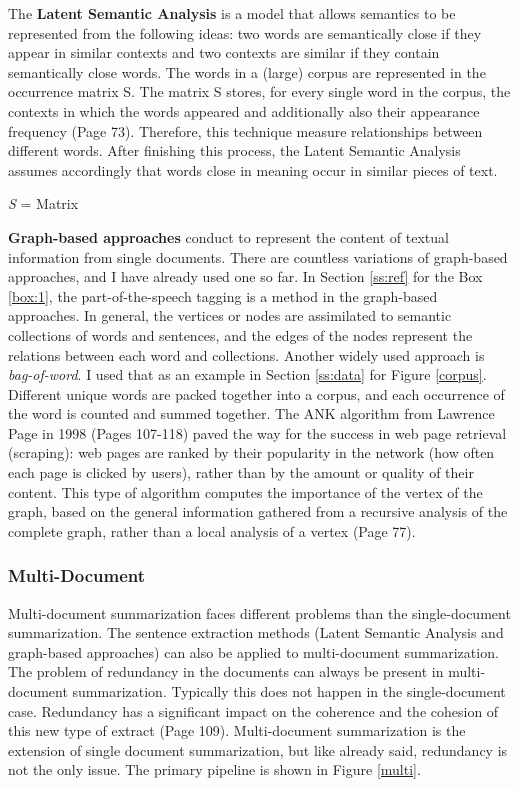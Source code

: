 The \textbf{Latent Semantic Analysis} \cite{Deerwester90indexingby} is a model that allows semantics to be represented from the following ideas: two words are semantically close if they appear in similar contexts and two contexts are similar if they contain semantically close words. The words in a (large) corpus are represented in the occurrence matrix S. The matrix S stores, for every single word in the corpus, the contexts in which the words appeared and additionally also their appearance frequency \cite{juan} (Page 73). Therefore, this technique measure relationships between different words. After finishing this process, the Latent Semantic Analysis assumes accordingly that words close in meaning occur in similar pieces of text.

\begin{tcolorbox}
	\textit{S} = Matrix
\end{tcolorbox}

\textbf{Graph-based approaches} conduct to represent the content of textual information from single documents. There are countless variations of graph-based approaches, and I have already used one so far. In Section \ref{ss:ref} for the Box \ref{box:1}, the part-of-the-speech tagging is a method in the graph-based approaches. In general, the vertices or nodes are assimilated to semantic collections of words and sentences, and the edges of the nodes represent the relations between each word and collections. 
Another widely used approach is \textit{bag-of-word}. I used that as an example in Section \ref{ss:data} for Figure \ref{corpus}. Different unique words are packed together into a corpus, and each occurrence of the word is counted and summed together. The ANK algorithm from Lawrence Page in 1998 \cite{brin1998anatomy} (Pages 107-118) paved the way for the success in web page retrieval (scraping): web pages are ranked by their popularity in the network (how often each page is clicked by users), rather than by the amount or quality of their content. This type of algorithm computes the importance of the vertex of the graph, based on the general information gathered from a recursive analysis of the complete graph, rather than a local analysis of a vertex \cite{juan} (Page 77).

\subsubsection{Multi-Document}\label{ss:multi}

Multi-document summarization faces different problems than the single-document summarization. The sentence extraction methods (Latent Semantic Analysis and graph-based approaches) can also be applied to multi-document summarization. The problem of redundancy in the documents can always be present in multi-document summarization. Typically this does not happen in the single-document case. Redundancy has a significant impact on the coherence and the cohesion of this new type of extract \cite{juan} (Page 109). Multi-document summarization is the extension of single document summarization, but like already said, redundancy is not the only issue. The primary pipeline is shown in Figure \ref{multi}. 

